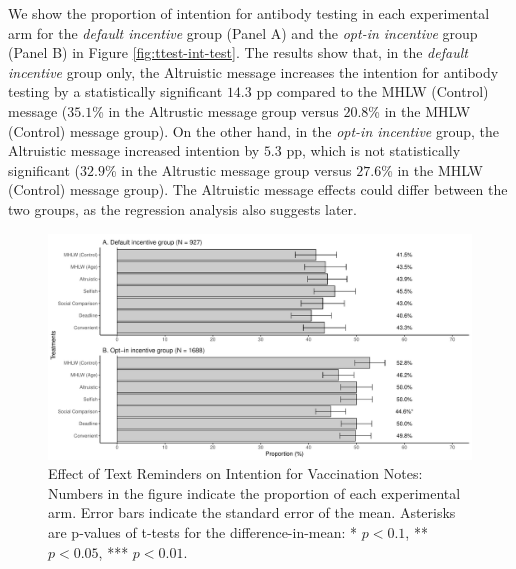 \documentclass[
]{article}
\begin{document}
We show the proportion of intention for antibody testing in each experimental arm for the \emph{default incentive} group (Panel A) and the \emph{opt-in incentive} group (Panel B) in Figure \ref{fig:ttest-int-test}. The results show that, in the \emph{default incentive} group only, the Altruistic message increases the intention for antibody testing by a statistically significant \(14.3\) pp compared to the MHLW (Control) message (\(35.1\)\% in the Altrustic message group versus \(20.8\)\% in the MHLW (Control) message group). On the other hand, in the \emph{opt-in incentive} group, the Altruistic message increased intention by \(5.3\) pp, which is not statistically significant (\(32.9\)\% in the Altrustic message group versus \(27.6\)\% in the MHLW (Control) message group). The Altruistic message effects could differ between the two groups, as the regression analysis also suggests later.

\begin{figure}[t]
\includegraphics{discussion-paper_files/figure-latex/ttest-int-vacc-1} \caption{Effect of Text Reminders on Intention for Vaccination Notes: Numbers in the figure indicate the proportion of each experimental arm. Error bars indicate the standard error of the mean. Asterisks are p-values of t-tests for the difference-in-mean: * $p < 0.1$, ** $p < 0.05$, *** $p < 0.01$.}\label{fig:ttest-int-vacc}
\end{figure}
\end{document}
